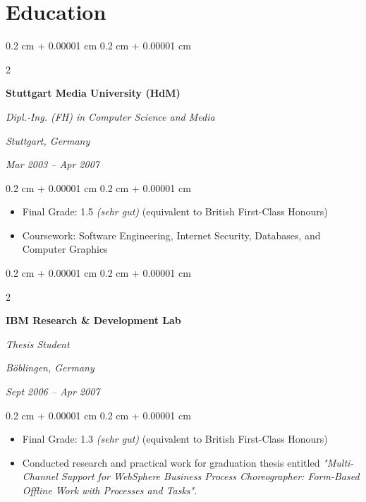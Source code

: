 \documentclass[10pt, a4paper]{article}
\newenvironment{highlights}{
    \begin{itemize}[
        topsep=0.10 cm,
        parsep=0.10 cm,
        partopsep=0pt,
        itemsep=0pt,
        leftmargin=0.4 cm + 10pt
    ]
}{
    \end{itemize}
} %
\newenvironment{onecolentry}{
    \begin{adjustwidth}{
        0.2 cm + 0.00001 cm
    }{
        0.2 cm + 0.00001 cm
    }
}{
    \end{adjustwidth}
} %
\newenvironment{twocolentry}[2][]{
    \onecolentry
    \def\secondColumn{#2}
    \setcolumnwidth{\fill, 8 cm}
    \begin{paracol}{2}
}{
    \switchcolumn \raggedleft \secondColumn
    \end{paracol}
    \endonecolentry
} %
\begin{document}
%
%
\section{Education}




\begin{twocolentry}{
        \textit{Stuttgart, Germany}

        \textit{Mar 2003 – Apr 2007}}
    \textbf{Stuttgart Media University (HdM)}

    \textit{Dipl.-Ing. (FH) in Computer Science and Media}
\end{twocolentry}

\vspace{0.10 cm}
\begin{onecolentry}
    \begin{highlights}
        \item Final Grade: 1.5 \textit{(sehr gut)} (equivalent to British First-Class Honours)
        \item Coursework: Software Engineering, Internet Security, Databases, and Computer Graphics
    \end{highlights}
\end{onecolentry}

\vspace{0.2 cm}

\begin{twocolentry}{

        \textit{Böblingen, Germany}

        \textit{Sept 2006 – Apr 2007}}
    \textbf{IBM Research \& Development Lab}

    \textit{Thesis Student}
\end{twocolentry}

\vspace{0.10 cm}
\begin{onecolentry}
    \begin{highlights}
        \item Final Grade: 1.3 \textit{(sehr gut)} (equivalent to British First-Class Honours)
        \item Conducted research and practical work for graduation thesis entitled \textit{"Multi-Channel Support for \mbox{WebSphere} Business Process Choreographer: Form-Based Offline Work with Processes and Tasks"}.
    \end{highlights}
\end{onecolentry}
\end{document}
